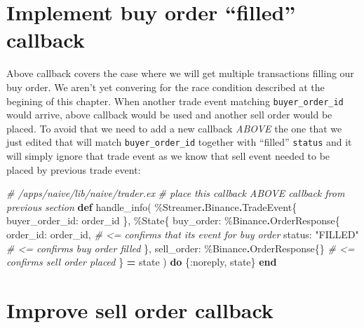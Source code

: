 \documentclass[
]{book}
\newenvironment{Shaded}{\begin{snugshade}}{\end{snugshade}}
\newcommand{\CommentTok}[1]{\textcolor[rgb]{0.56,0.35,0.01}{\textit{#1}}}
\newcommand{\ConstantTok}[1]{\textcolor[rgb]{0.00,0.00,0.00}{#1}}
\newcommand{\KeywordTok}[1]{\textcolor[rgb]{0.13,0.29,0.53}{\textbf{#1}}}
\newcommand{\NormalTok}[1]{#1}
\newcommand{\OperatorTok}[1]{\textcolor[rgb]{0.81,0.36,0.00}{\textbf{#1}}}
\newcommand{\StringTok}[1]{\textcolor[rgb]{0.31,0.60,0.02}{#1}}
\newcommand{\VariableTok}[1]{\textcolor[rgb]{0.00,0.00,0.00}{#1}}
\begin{document}
\hypertarget{implement-buy-order-filled-callback}{%
\section{Implement buy order ``filled'' callback}\label{implement-buy-order-filled-callback}}

Above callback covers the case where we will get multiple transactions filling our buy order. We aren't yet convering for the race condition described at the begining of this chapter. When another trade event matching \texttt{buyer\_order\_id} would arrive, above callback would be used and another sell order would be placed. To avoid that we need to add a new callback \emph{ABOVE} the one that we just edited that will match \texttt{buyer\_order\_id} together with ``filled'' \texttt{status} and it will simply ignore that trade event as we know that sell event needed to be placed by previous trade event:

\begin{Shaded}
\begin{Highlighting}[]
  \CommentTok{\# /apps/naive/lib/naive/trader.ex}
  \CommentTok{\# place this callback ABOVE callback from previous section}
  \KeywordTok{def}\NormalTok{ handle\_info(}
\NormalTok{        \%}\ConstantTok{Streamer}\OperatorTok{.}\ConstantTok{Binance}\OperatorTok{.}\ConstantTok{TradeEvent}\NormalTok{\{}
          \VariableTok{buyer\_order\_id:}\NormalTok{ order\_id}
\NormalTok{        \},}
\NormalTok{        \%}\ConstantTok{State}\NormalTok{\{}
          \VariableTok{buy\_order:}\NormalTok{ \%}\ConstantTok{Binance}\OperatorTok{.}\ConstantTok{OrderResponse}\NormalTok{\{}
            \VariableTok{order\_id:}\NormalTok{ order\_id, }\CommentTok{\# \textless{}= confirms that it\textquotesingle{}s event for buy order}
            \VariableTok{status:} \StringTok{"FILLED"} \CommentTok{\# \textless{}= confirms buy order filled}
\NormalTok{          \},}
          \VariableTok{sell\_order:}\NormalTok{ \%}\ConstantTok{Binance}\OperatorTok{.}\ConstantTok{OrderResponse}\NormalTok{\{\} }\CommentTok{\# \textless{}= confirms sell order placed}
\NormalTok{        \} }\OperatorTok{=}\NormalTok{ state}
\NormalTok{      ) }\KeywordTok{do}
\NormalTok{    \{}\VariableTok{:noreply}\NormalTok{, state\}}
  \KeywordTok{end}
\end{Highlighting}
\end{Shaded}

\hypertarget{improve-sell-order-callback}{%
\section{Improve sell order callback}\label{improve-sell-order-callback}}
\end{document}
